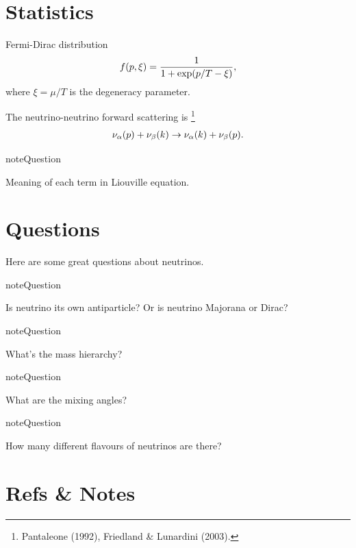 \documentclass[letterpaper,12pt,english]{sphinxmanual}
\begin{document}
\section{Statistics}
\label{preliminary:statistics}
Fermi-Dirac distribution
\begin{gather}
\begin{split}f(p,\xi) = \frac{1}{1+\exp (p/T-\xi)},\end{split}\notag
\end{gather}
where \(\xi=\mu/T\) is the degeneracy parameter.

The neutrino-neutrino forward scattering is \footnote{
Pantaleone (1992), Friedland \& Lunardini (2003).
}
\begin{gather}
\begin{split}\nu_\alpha (p) + \nu_\beta (k) \to \nu_\alpha (k)+\nu_\beta (p).\end{split}\notag
\end{gather}
\begin{notice}{note}{Question}

Meaning of each term in Liouville equation.
\end{notice}


\section{Questions}
\label{preliminary:questions}
Here are some great questions about neutrinos.

\begin{notice}{note}{Question}

Is neutrino its own antiparticle? Or is neutrino Majorana or Dirac?
\end{notice}

\begin{notice}{note}{Question}

What's the mass hierarchy?
\end{notice}

\begin{notice}{note}{Question}

What are the mixing angles?
\end{notice}

\begin{notice}{note}{Question}

How many different flavours of neutrinos are there?
\end{notice}


\section{Refs \& Notes}
\label{preliminary:refs-notes}
\end{document}
